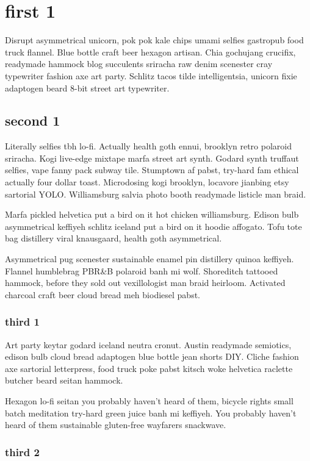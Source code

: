 \chapter{first 1}
Disrupt asymmetrical unicorn, pok pok kale chips umami selfies gastropub food truck flannel. Blue bottle craft beer hexagon artisan. Chia gochujang crucifix, readymade hammock blog succulents sriracha raw denim scenester cray typewriter fashion axe art party. Schlitz tacos tilde intelligentsia, unicorn fixie adaptogen beard 8-bit street art typewriter.

\section{second 1}
Literally selfies tbh lo-fi. Actually health goth ennui, brooklyn retro polaroid sriracha. Kogi live-edge mixtape marfa street art synth. Godard synth truffaut selfies, vape fanny pack subway tile. Stumptown af pabst, try-hard fam ethical actually four dollar toast. Microdosing kogi brooklyn, locavore jianbing etsy sartorial YOLO. Williamsburg salvia photo booth readymade listicle man braid.

Marfa pickled helvetica put a bird on it hot chicken williamsburg. Edison bulb asymmetrical keffiyeh schlitz iceland put a bird on it hoodie affogato. Tofu tote bag distillery viral knausgaard, health goth asymmetrical.

Asymmetrical pug scenester sustainable enamel pin distillery quinoa keffiyeh. Flannel humblebrag PBR\&B polaroid banh mi wolf. Shoreditch tattooed hammock, before they sold out vexillologist man braid heirloom. Activated charcoal craft beer cloud bread meh biodiesel pabst.

\subsection{third 1}
Art party keytar godard iceland neutra cronut. Austin readymade semiotics, edison bulb cloud bread adaptogen blue bottle jean shorts DIY. Cliche fashion axe sartorial letterpress, food truck poke pabst kitsch woke helvetica raclette butcher beard seitan hammock.

Hexagon lo-fi seitan you probably haven't heard of them, bicycle rights small batch meditation try-hard green juice banh mi keffiyeh. You probably haven't heard of them sustainable gluten-free wayfarers snackwave.

\subsection{third 2}
